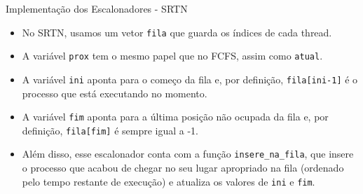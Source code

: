 \documentclass[10pt]{beamer}
\begin{document}
    \begin{frame}{Implementação dos Escalonadores - SRTN}
        \begin{itemize}
            \justifying
            \item No SRTN, usamos um vetor \texttt{fila} que guarda os índices de cada thread.

            \item A variável \texttt{prox} tem o mesmo papel que no FCFS, assim como
        \texttt{atual}.

            \item A variável \texttt{ini} aponta para o começo da fila e, por definição,
        \texttt{fila[ini-1]} é o processo que está executando no momento.

            \item A variável \texttt{fim} aponta para a última posição não ocupada da fila e,
        por definição, \texttt{fila[fim]} é sempre igual a -1.

            \item Além disso, esse escalonador conta com a função \texttt{insere\_na\_fila}, que
        insere o processo que acabou de chegar no seu lugar apropriado na fila
        (ordenado pelo tempo restante de execução) e atualiza os valores de
        \texttt{ini} e \texttt{fim}.
        \end{itemize}
    \end{frame}
\end{document}
